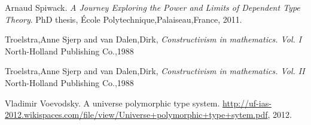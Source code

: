\documentclass[12pt]{article}
\begin{document}
\begin{thebibliography}{99}
 {Arnaud Spiwack}. \emph{A Journey Exploring the Power and Limits of Dependent Type Theory}. PhD thesis, {{\'Ecole Polytechnique,Palaiseau,France}}, 2011.

 {Troelstra,Anne Sjerp and van Dalen,Dirk}, \emph{{Constructivism in mathematics. {V}ol. {I}}}  {North-Holland Publishing Co.},{1988}

 {Troelstra,Anne Sjerp and van Dalen,Dirk}, \emph{{Constructivism in mathematics. {V}ol. {II}}}  {North-Holland Publishing Co.},{1988}

 {Vladimir Voevodsky}. {A universe polymorphic type system}. {\url{http://uf-ias-2012.wikispaces.com/file/view/Universe+polymorphic+type+sytem.pdf}}, 2012.

\end{thebibliography}
\end{document}
